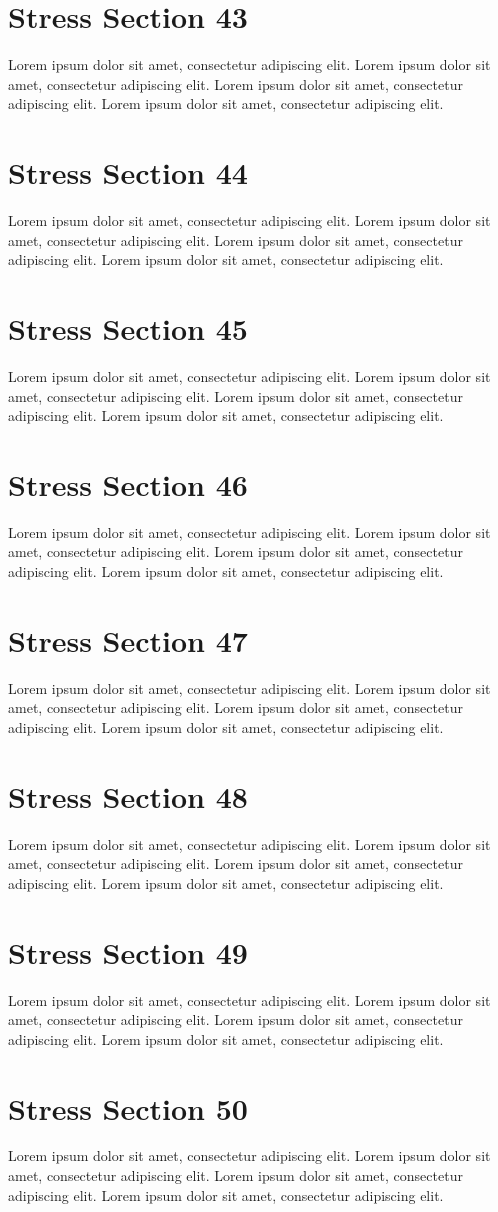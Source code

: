 \documentclass{article}
\begin{document}
\section{Stress Section 43}
Lorem ipsum dolor sit amet, consectetur adipiscing elit. Lorem ipsum dolor sit amet, consectetur adipiscing elit. Lorem ipsum dolor sit amet, consectetur adipiscing elit. Lorem ipsum dolor sit amet, consectetur adipiscing elit. \newpage
\section{Stress Section 44}
Lorem ipsum dolor sit amet, consectetur adipiscing elit. Lorem ipsum dolor sit amet, consectetur adipiscing elit. Lorem ipsum dolor sit amet, consectetur adipiscing elit. Lorem ipsum dolor sit amet, consectetur adipiscing elit. \newpage
\section{Stress Section 45}
Lorem ipsum dolor sit amet, consectetur adipiscing elit. Lorem ipsum dolor sit amet, consectetur adipiscing elit. Lorem ipsum dolor sit amet, consectetur adipiscing elit. Lorem ipsum dolor sit amet, consectetur adipiscing elit. \newpage
\section{Stress Section 46}
Lorem ipsum dolor sit amet, consectetur adipiscing elit. Lorem ipsum dolor sit amet, consectetur adipiscing elit. Lorem ipsum dolor sit amet, consectetur adipiscing elit. Lorem ipsum dolor sit amet, consectetur adipiscing elit. \newpage
\section{Stress Section 47}
Lorem ipsum dolor sit amet, consectetur adipiscing elit. Lorem ipsum dolor sit amet, consectetur adipiscing elit. Lorem ipsum dolor sit amet, consectetur adipiscing elit. Lorem ipsum dolor sit amet, consectetur adipiscing elit. \newpage
\section{Stress Section 48}
Lorem ipsum dolor sit amet, consectetur adipiscing elit. Lorem ipsum dolor sit amet, consectetur adipiscing elit. Lorem ipsum dolor sit amet, consectetur adipiscing elit. Lorem ipsum dolor sit amet, consectetur adipiscing elit. \newpage
\section{Stress Section 49}
Lorem ipsum dolor sit amet, consectetur adipiscing elit. Lorem ipsum dolor sit amet, consectetur adipiscing elit. Lorem ipsum dolor sit amet, consectetur adipiscing elit. Lorem ipsum dolor sit amet, consectetur adipiscing elit. \newpage
\section{Stress Section 50}
Lorem ipsum dolor sit amet, consectetur adipiscing elit. Lorem ipsum dolor sit amet, consectetur adipiscing elit. Lorem ipsum dolor sit amet, consectetur adipiscing elit. Lorem ipsum dolor sit amet, consectetur adipiscing elit. \newpage
\end{document}
